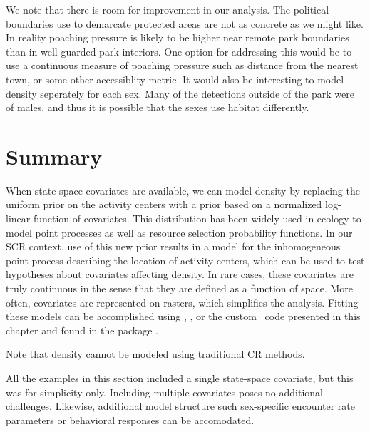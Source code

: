 We note that there is room for improvement in our analysis. The
political boundaries use to demarcate protected areas are not as
concrete as we might like. In reality poaching pressure is likely to
be higher near remote park boundaries than in well-guarded park
interiors. One option
for addressing this would be to use a continuous measure of poaching
pressure such as distance from the nearest town, or some other
accessiblity metric. It would also be interesting to model density
seperately for each sex. Many of the detections outside of the park
were of males, and thus it is possible that the sexes use habitat
differently.




\section{Summary}

When state-space covariates are available, we can model
density by replacing the uniform prior on the activity centers with a
prior based on a normalized log-linear function of covariates. This
distribution has been widely used in ecology to model point processes
as well as resource selection probability functions. In our SCR
context, use of this new prior results in
a model for the inhomogeneous point process describing the
location of activity centers, which can be used to test hypotheses
about covariates affecting density. In
rare cases, these covariates are truly continuous in the sense that
they are defined as a function of space. More often, covariates are
represented on rasters, which simplifies the analysis. Fitting these
models can be accomplished using \bugs, \secr, or the custom \R~code
presented in this chapter and found in the package \scrbook.

Note that density cannot be modeled using traditional CR methods.

All the examples in this section included a single state-space
covariate, but this was for simplicity only. Including multiple
covariates poses no additional challenges. Likewise, additional model
structure such sex-specific encounter rate parameters or behavioral
responses can be accomodated.

